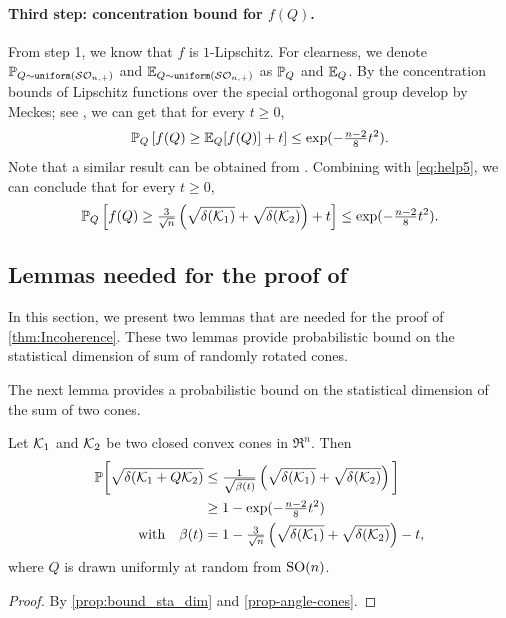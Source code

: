 \paragraph{Third step: concentration bound for $f(Q)$.}
From step 1, we know that $f$ is $1$-Lipschitz. For clearness, we denote $\mathbb{P}_{Q \sim \operatorname{\texttt{uniform}}(\mathcal{S}\mathcal{O}_{n, +})}$ and $\mathbb{E}_{Q \sim \operatorname{\texttt{uniform}}(\mathcal{S}\mathcal{O}_{n, +})}$ as $\mathbb{P}_Q$ and $\mathbb{E}_Q$. By the concentration bounds of Lipschitz functions over the special orthogonal group develop by Meckes; see \cite[Theorem~5.5 and Theorem~5.16]{meckes2019random}, we can get that for every $t\geq0$,
\[\mathbb{P}_Q\left[f(Q) \geq \mathbb{E}_Q[f(Q)] + t\right] \leq \exp(-\tfrac{n-2}{8}t^2).\]
Note that a similar result can be obtained from \cite[Theorem~5.2.7]{vershynin2018high}.
Combining with \eqref{eq:help5}, we can conclude that for every $t\geq0$,
\[\mathbb{P}_Q\left[f(Q) \geq  \tfrac{3}{\sqrt{n}}\left( \sqrt{\delta(\mathcal{K}_1)} + \sqrt{\delta(\mathcal{K}_2)} \right) + t\right] \leq \exp(-\tfrac{n-2}{8}t^2).\]

\subsection{Lemmas needed for the proof of } \label{sec:prob_bounds}
In this section, we present two lemmas that are needed for the proof of \autoref{thm:Incoherence}. These two lemmas provide probabilistic bound on the statistical dimension of sum of randomly rotated cones. 

The next lemma provides a probabilistic bound on the statistical dimension of the sum of two cones. 
\begin{lemma} \label{prop-bound-sta-dim}
   Let $\mathcal{K}_1$ and $\mathcal{K}_2$ be two closed convex cones in $\Re^n$. Then 
 \begin{align*}
   \mathbb{P}\bigg[\sqrt{\delta(\mathcal{K}_1 + Q\mathcal{K}_2)} &\leq \tfrac{1}{\sqrt{\beta(t)}}\left(\sqrt{\delta(\mathcal{K}_1)} + \sqrt{\delta(\mathcal{K}_2)} \right) \bigg]
   \\&\geq 1 - \exp(-\tfrac{n-2}{8}t^2)
   \\\hbox{\quad with\quad} \beta(t) &= 1 - \tfrac{3}{\sqrt{n}}\left(\sqrt{\delta(\mathcal{K}_1)} + \sqrt{\delta(\mathcal{K}_2)}\right) - t ,
 \end{align*}
   where $Q$ is drawn uniformly at random from $\operatorname{SO}(n)$.
\end{lemma}

\begin{proof}
    By \autoref{prop:bound_sta_dim} and \autoref{prop-angle-cones}.
\end{proof}

